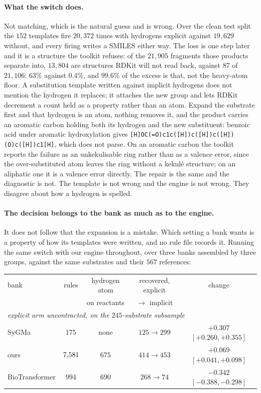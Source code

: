 \paragraph{What the switch does.} Not matching, which is the natural guess and is wrong. Over the
clean test split the $152$ templates fire $20{,}372$ times with hydrogens explicit against
$19{,}629$ without, and every firing writes a SMILES either way. The loss is one step later and it is
a structure the toolkit refuses: of the $21{,}905$ fragments those products separate into,
$13{,}804$ are structures RDKit will not read back, against $87$ of $21{,}106$: $63\%$ against $0.4\%$, and
$99.6\%$ of the excess is that, not the heavy-atom floor. A
substitution template written against implicit hydrogens does not mention the hydrogen it replaces;
it attaches the new group and lets RDKit decrement a count held as a property rather than an atom.
Expand the substrate first and that hydrogen is an atom, nothing removes it, and the product carries
an aromatic carbon holding both its hydrogen and the new substituent: benzoic acid under aromatic
hydroxylation gives \texttt{[H]OC(=O)c1c([H])c([H])c([H])(O)c([H])c1[H]}, which does not parse. On
an aromatic carbon the toolkit reports the failure as an unkekulisable ring rather than as a valence
error, since the over-substituted atom leaves the ring without a kekul\'e structure; on an aliphatic
one it is a valence error directly. The repair is the same and the diagnostic is not. The
template is not wrong and the engine is not wrong. They disagree about how a hydrogen is spelled.

\paragraph{The decision belongs to the bank as much as to the engine.} It does not follow that the
expansion is a mistake. Which setting a bank wants is a property of how its templates were written,
and no rule file records it. Running the same switch with our engine throughout, over three banks
assembled by three groups, against the same substrates and their $567$ references:

\begin{center}
\small
\begin{tabular}{lcccc}
\toprule
bank & rules & hydrogen atom & recovered, explicit & change \\
     &       & on reactants  & $\to$ implicit      & \\
\multicolumn{5}{l}{\emph{explicit arm uncontracted, on the $245$-substrate subsample}} \\
\midrule
SyGMa          & $175$    & none  & $125 \to 299$ & $+0.307$ $[+0.260,+0.355]$ \\
ours           & $7{,}581$ & $675$ & $414 \to 453$ & $+0.069$ $[+0.041,+0.098]$ \\
BioTransformer & $994$    & $690$ & $268 \to 74$  & $-0.342$ $[-0.388,-0.298]$ \\
\bottomrule
\end{tabular}
\end{center}

